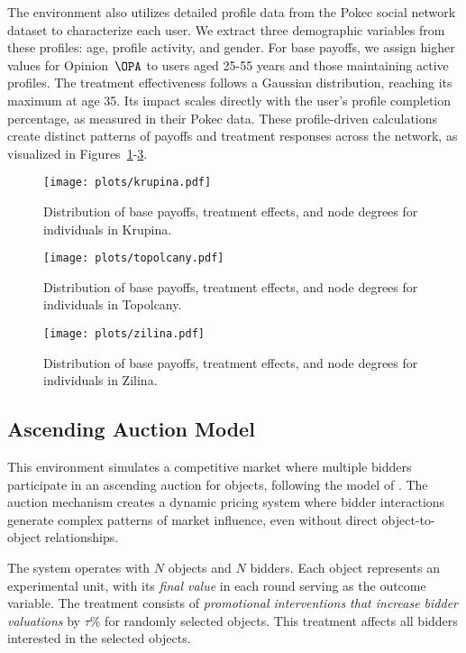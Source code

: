 The environment also utilizes detailed profile data from the Pokec social network dataset to characterize each user. We extract three demographic variables from these profiles: age, profile activity, and gender. For base payoffs, we assign higher values for Opinion~$\OPA$ to users aged 25-55 years and those maintaining active profiles. The treatment effectiveness follows a Gaussian distribution, reaching its maximum at age 35. Its impact scales directly with the user's profile completion percentage, as measured in their Pokec data. These profile-driven calculations create distinct patterns of payoffs and treatment responses across the network, as visualized in Figures~\ref{fig:BAM-krupina}-\ref{fig:BAM-zilina}.

\begin{figure}
    \centering
    \texttt{[image: plots/krupina.pdf]}
    \caption{Distribution of base payoffs, treatment effects, and node degrees for individuals in Krupina.}
    \label{fig:BAM-krupina}
\end{figure}

\begin{figure}
    \centering
    \texttt{[image: plots/topolcany.pdf]}
    \caption{Distribution of base payoffs, treatment effects, and node degrees for individuals in Topolcany.}
    \label{fig:BAM-topolcany}
\end{figure}

\begin{figure}
    \centering
    \texttt{[image: plots/zilina.pdf]}
    \caption{Distribution of base payoffs, treatment effects, and node degrees for individuals in Zilina.}
    \label{fig:BAM-zilina}
\end{figure}


\subsection{Ascending Auction Model}
\label{sec:Auction}
% 
This environment simulates a competitive market where multiple bidders participate in an ascending auction for objects, following the model of \cite{bertsekas1990auction}. The auction mechanism creates a dynamic pricing system where bidder interactions generate complex patterns of market influence, even without direct object-to-object relationships.

The system operates with $N$ objects and $N$ bidders. Each object represents an experimental unit, with its \emph{final value} in each round serving as the outcome variable. The treatment consists of \emph{promotional interventions that increase bidder valuations} by $\tau$\% for randomly selected objects. This treatment affects all bidders interested in the selected objects.

